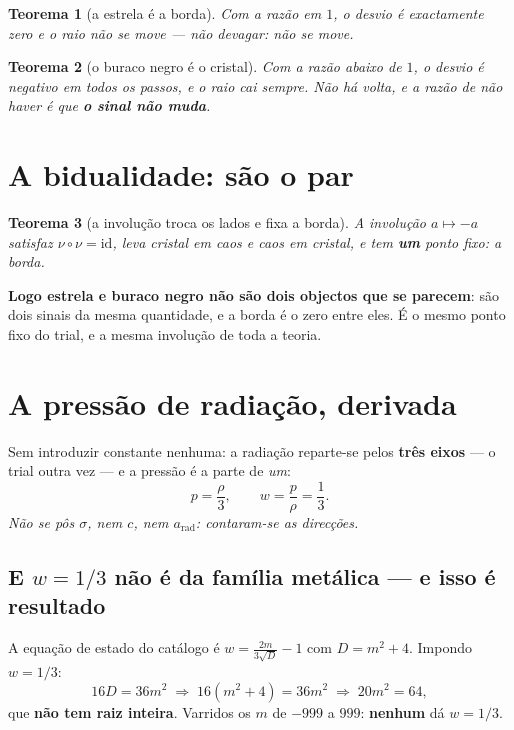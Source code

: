 \documentclass[11pt,a4paper]{article}
\newtheorem{teorema}{Teorema}
\begin{document}
\begin{teorema}[a estrela é a borda]
Com a razão em $1$, o desvio é exactamente zero e o raio não se move --- não devagar: \emph{não se
move}.
\end{teorema}

\begin{teorema}[o buraco negro é o cristal]
Com a razão abaixo de $1$, o desvio é negativo em todos os passos, e o raio cai \emph{sempre}. Não
há volta, e a razão de não haver é que \textbf{o sinal não muda}.
\end{teorema}

\section{A bidualidade: são o par}

\begin{teorema}[a involução troca os lados e fixa a borda]
A involução $a\mapsto-a$ satisfaz $\nu\circ\nu=\mathrm{id}$, leva cristal em caos e caos em
cristal, e tem \textbf{um} ponto fixo: a borda.
\end{teorema}

\noindent \textbf{Logo estrela e buraco negro não são dois objectos que se parecem}: são dois
sinais da mesma quantidade, e a borda é o zero entre eles. É o mesmo ponto fixo do trial, e a mesma
involução de toda a teoria.

\section{A pressão de radiação, derivada}

Sem introduzir constante nenhuma: a radiação reparte-se pelos \textbf{três eixos} --- o trial
outra vez --- e a pressão é a parte de \emph{um}:
\[
  p=\frac{\rho}{3}, \qquad w=\frac{p}{\rho}=\frac13 .
\]
\emph{Não se pôs $\sigma$, nem $c$, nem $a_{\text{rad}}$: contaram-se as direcções.}

\subsection*{E $w=1/3$ não é da família metálica --- e isso é resultado}

A equação de estado do catálogo é $w=\frac{2m}{3\sqrt D}-1$ com $D=m^2+4$. Impondo $w=1/3$:
\[
  16D = 36m^2 \;\Longrightarrow\; 16(m^2+4)=36m^2 \;\Longrightarrow\; 20m^2=64,
\]
que \textbf{não tem raiz inteira}. Varridos os $m$ de $-999$ a $999$: \textbf{nenhum} dá $w=1/3$.
\end{document}
